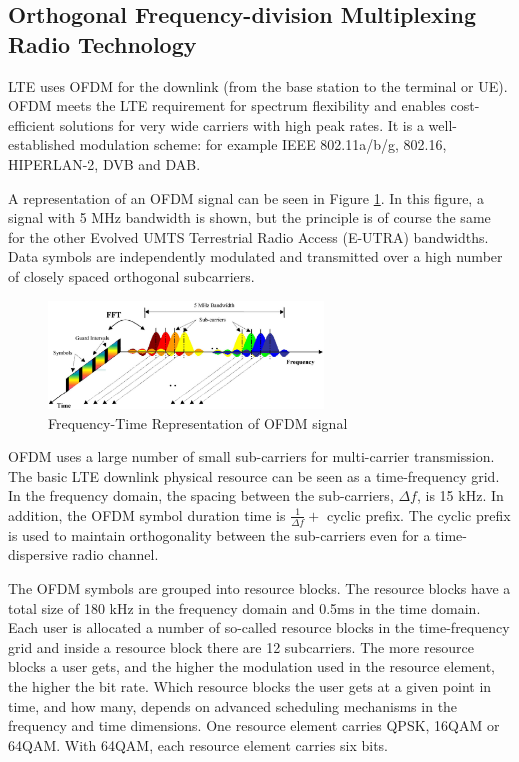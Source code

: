 \subsection{Orthogonal Frequency-division Multiplexing Radio Technology} %

LTE uses OFDM for the downlink (from the base station to the terminal or UE).
OFDM meets the LTE requirement for spectrum flexibility and enables
cost-efficient solutions for very wide carriers with high peak rates. It is a
well-established modulation scheme: for example IEEE 802.11a/b/g, 802.16,
HIPERLAN-2, DVB and DAB.

A representation of an OFDM signal can be seen in Figure \ref{fig:ofdmfreq}. In
this figure, a signal with 5 MHz bandwidth is shown, but the principle is of
course the same for the other Evolved UMTS Terrestrial Radio Access (E-UTRA)
bandwidths. Data symbols are independently modulated and transmitted over a high
number of closely spaced orthogonal subcarriers.

\begin{figure}[htbp]
    \centering
    \includegraphics[width=0.65\textwidth]{./figures/ofdm_frequency}
    \caption{ Frequency-Time Representation of OFDM signal
    \label{fig:ofdmfreq}}
\end{figure}

OFDM uses a large number of small sub-carriers for multi-carrier transmission.
The basic LTE downlink physical resource can be seen as a time-frequency grid.
In the frequency domain, the spacing between the sub-carriers, $\Delta f$, is 15
kHz. In addition, the OFDM symbol duration time is $\frac{1}{\Delta f} +$ cyclic prefix.
The cyclic prefix is used to maintain orthogonality between the sub-carriers even
for a time-dispersive radio channel.

The OFDM symbols are grouped into resource blocks. The resource blocks have a
total size of 180 kHz in the frequency domain and 0.5ms in the time domain. Each
user is allocated a number of so-called resource blocks in the time-frequency
grid and inside a resource block there are 12 subcarriers. The more resource
blocks a user gets, and the higher the modulation used in the resource element,
the higher the bit rate. Which resource blocks the user gets at a given point in
time, and how many, depends on advanced scheduling mechanisms in the frequency
and time dimensions. One resource element carries QPSK, 16QAM or 64QAM. With
64QAM, each resource element carries six bits.

